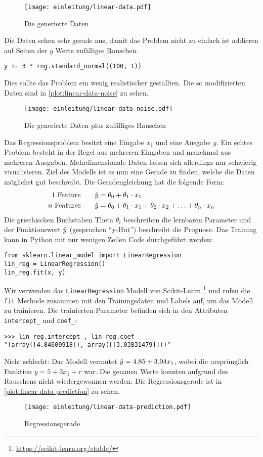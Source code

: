 \begin{figure}[!h]
  \centering
  \texttt{[image: einleitung/linear-data.pdf]}
  \caption{Die generierte Daten}
  \label{plot:linear-data}
\end{figure}

\noindent
Die Daten sehen sehr gerade aus, damit das Problem nicht zu einfach ist
addieren auf Seiten der $y$ Werte zufälliges Rauschen.
\begin{lstlisting}
y += 3 * rng.standard_normal((100, 1))
\end{lstlisting}
Dies sollte das Problem ein wenig realistischer gestallten.
Die so modifizierten Daten sind in \autoref{plot:linear-data-noise} zu sehen.
\begin{figure}[!h]
  \centering
  \texttt{[image: einleitung/linear-data-noise.pdf]}
  \caption{Die generierte Daten plus zufälliges Rauschen}
  \label{plot:linear-data-noise}
\end{figure}
Das Regressionsproblem besitzt eine Eingabe $x_1$ und eine Ausgabe $y$.
Ein echtes Problem besteht in der Regel aus mehreren Eingaben und manchmal
aus mehreren Ausgaben. Mehrdimensionale Daten lassen sich allerdings nur schwierig
visualisieren. Ziel des Modells ist es nun eine Gerade zu finden, welche die
Daten möglichst gut beschreibt. Die Geradengleichung hat die folgende Form:
\begin{align}
  \text{1 Feature}\qquad    & \hat{y} = \theta_0 + \theta_1 \cdot x_1   \\
  \text{$n$ Features}\qquad & \hat{y} = \theta_0 + \theta_1 \cdot x_1 +
  \theta_2 \cdot x_2 + \ldots + \theta_n \cdot x_n
\end{align}
Die griechischen Buchstaben Theta $\theta_i$ beschreiben die lernbaren Parameter und
der Funktionswert $\hat{y}$ (gesprochen \enquote{y-Hut}) beschreibt die Prognose.
Das Training kann in Python mit nur wenigen Zeilen Code durchgeführt werden:
\begin{lstlisting}
from sklearn.linear_model import LinearRegression
lin_reg = LinearRegression()
lin_reg.fit(x, y)
\end{lstlisting}
Wir verwenden das \lstinline{LinearRegression} Modell von Scikit-Learn
\footnote{\url{https://scikit-learn.org/stable/}} und rufen die \lstinline{fit}
Methode zusammen mit den Trainingsdaten und Labels auf, um das Modell zu trainieren.
Die trainierten Parameter befinden sich in den Attributen \lstinline{intercept_}
und \lstinline{coef_}:
\begin{lstlisting}
>>> lin_reg.intercept_, lin_reg.coef_
°(array([4.84609918]), array([[3.03831479]]))°
\end{lstlisting}
Nicht schlecht: Das Modell vermutet $\hat{y} = 4.85 + 3.04x_1$, wobei die ursprünglich
Funktion $y = 5 + 3x_1 + r$ war. Die genauen Werte konnten aufgrund des Rauschens
nicht wiedergewonnen werden. Die Regressionsgerade ist
in \autoref{plot:linear-data-prediction} zu sehen.
\begin{figure}[!h]
  \centering
  \texttt{[image: einleitung/linear-data-prediction.pdf]}
  \caption{Regressionsgerade}
  \label{plot:linear-data-prediction}
\end{figure}

